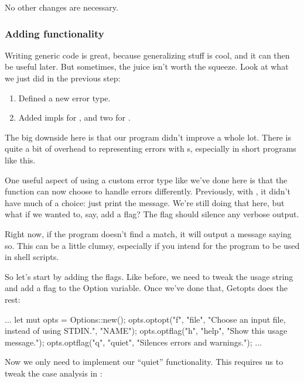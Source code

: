 No other changes are necessary.

\subsubsection*{Adding functionality}

Writing generic code is great, because generalizing stuff is cool, and it can then be useful later. But sometimes, the 
juice isn't worth the squeeze. Look at what we just did in the previous step:

\begin{enumerate}
  \item{Defined a new error type.}
  \item{Added impls for ,  and two for .}
\end{enumerate}

The big downside here is that our program didn't improve a whole lot. There is quite a bit of overhead to representing 
errors with \enum s, especially in short programs like this.

\blank

One useful aspect of using a custom error type like we've done here is that the  function can now choose to 
handle errors differently. Previously, with , it didn't have much of a choice: just print the message. 
We're still doing that here, but what if we wanted to, say, add a  flag? The  flag should 
silence any verbose output.

\blank

Right now, if the program doesn't find a match, it will output a message saying so. This can be a little clumsy, especially 
if you intend for the program to be used in shell scripts.

\blank

So let's start by adding the flags. Like before, we need to tweak the usage string and add a flag to the Option variable. 
Once we've done that, Getopts does the rest:

\begin{rustc}
...
let mut opts = Options::new();
opts.optopt("f", "file", "Choose an input file, instead of using STDIN.", "NAME");
opts.optflag("h", "help", "Show this usage message.");
opts.optflag("q", "quiet", "Silences errors and warnings.");
...
\end{rustc}

Now we only need to implement our \enquote{quiet} functionality. This requires us to tweak the case analysis in :

